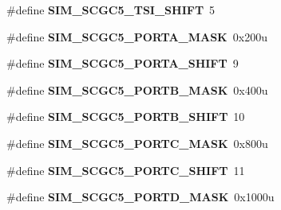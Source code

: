 \begin{DoxyCompactItemize}
\item 
\hypertarget{group___s_i_m___register___masks_ga3e9511b0e9cf6b524a0a405b172038da}{}\#define {\bfseries S\+I\+M\+\_\+\+S\+C\+G\+C5\+\_\+\+T\+S\+I\+\_\+\+S\+H\+I\+F\+T}~5\label{group___s_i_m___register___masks_ga3e9511b0e9cf6b524a0a405b172038da}

\item 
\hypertarget{group___s_i_m___register___masks_ga9c4853233394870202cccd7844fc8a56}{}\#define {\bfseries S\+I\+M\+\_\+\+S\+C\+G\+C5\+\_\+\+P\+O\+R\+T\+A\+\_\+\+M\+A\+S\+K}~0x200u\label{group___s_i_m___register___masks_ga9c4853233394870202cccd7844fc8a56}

\item 
\hypertarget{group___s_i_m___register___masks_gaa7a1683eaa07a5c5adcaddf4b99ed83a}{}\#define {\bfseries S\+I\+M\+\_\+\+S\+C\+G\+C5\+\_\+\+P\+O\+R\+T\+A\+\_\+\+S\+H\+I\+F\+T}~9\label{group___s_i_m___register___masks_gaa7a1683eaa07a5c5adcaddf4b99ed83a}

\item 
\hypertarget{group___s_i_m___register___masks_ga5509cf72c7508dd77f0a1a9e631943e8}{}\#define {\bfseries S\+I\+M\+\_\+\+S\+C\+G\+C5\+\_\+\+P\+O\+R\+T\+B\+\_\+\+M\+A\+S\+K}~0x400u\label{group___s_i_m___register___masks_ga5509cf72c7508dd77f0a1a9e631943e8}

\item 
\hypertarget{group___s_i_m___register___masks_ga491c4800f5437a9e2d235a77819e434d}{}\#define {\bfseries S\+I\+M\+\_\+\+S\+C\+G\+C5\+\_\+\+P\+O\+R\+T\+B\+\_\+\+S\+H\+I\+F\+T}~10\label{group___s_i_m___register___masks_ga491c4800f5437a9e2d235a77819e434d}

\item 
\hypertarget{group___s_i_m___register___masks_gaac31449d101ad0d05f2bed682571be35}{}\#define {\bfseries S\+I\+M\+\_\+\+S\+C\+G\+C5\+\_\+\+P\+O\+R\+T\+C\+\_\+\+M\+A\+S\+K}~0x800u\label{group___s_i_m___register___masks_gaac31449d101ad0d05f2bed682571be35}

\item 
\hypertarget{group___s_i_m___register___masks_gae141a6d4af583e7410d0120442b1012f}{}\#define {\bfseries S\+I\+M\+\_\+\+S\+C\+G\+C5\+\_\+\+P\+O\+R\+T\+C\+\_\+\+S\+H\+I\+F\+T}~11\label{group___s_i_m___register___masks_gae141a6d4af583e7410d0120442b1012f}

\item 
\hypertarget{group___s_i_m___register___masks_ga723a55222eb5f8fd25da5c956aa50e7b}{}\#define {\bfseries S\+I\+M\+\_\+\+S\+C\+G\+C5\+\_\+\+P\+O\+R\+T\+D\+\_\+\+M\+A\+S\+K}~0x1000u\label{group___s_i_m___register___masks_ga723a55222eb5f8fd25da5c956aa50e7b}


\end{DoxyCompactItemize}
